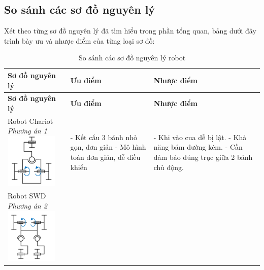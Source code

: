         \subsection{So sánh các sơ đồ nguyên lý}
            \hspace*{0.6cm}Xét theo từng sơ đồ nguyên lý đã tìm hiểu trong phần tổng quan, bảng dưới đây 
trình bày ưu và nhược điểm của từng loại sơ đồ:
            \begin{longtable}{|p{4cm}|p{5cm}|p{5cm}|}
                \caption{So sánh các sơ đồ nguyên lý robot} 
                \label{tab:compare_robot_schemes} \\ 
                \hline
                \textbf{Sơ đồ nguyên lý} & \textbf{Ưu điểm} & \textbf{Nhược điểm} \\
                \hline
                \endfirsthead
                \hline
                \textbf{Sơ đồ nguyên lý} & \textbf{Ưu điểm} & \textbf{Nhược điểm} \\
                \hline
                \endhead
                \hline
                \endfoot
                \hline
                \endlastfoot
                Robot Chariot \newline
                \textit{Phương án 1} \newline
                \includegraphics[width=2.5cm]{pictures/robot_chariot.png} & 
                - Kết cấu 3 bánh nhỏ gọn, đơn giản \newline
                - Mô hình toán đơn giản, dễ điều khiển & 
                - Khi vào cua dễ bị lật. \newline
                - Khả năng bám đường kém. \newline
                - Cần đảm bảo đúng trục giữa 2 bánh chủ động. \\
                \hline
                Robot SWD \newline
                \textit{Phương án 2} \newline
                \includegraphics[width=2.5cm]{pictures/robot_swd.png} & 

\end{longtable}
